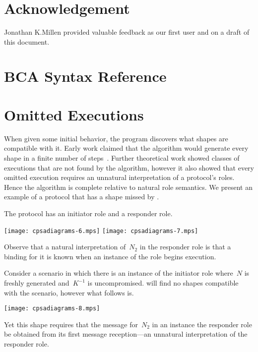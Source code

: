 \documentclass[12pt]{article}
\begin{document}
\section*{Acknowledgement}

Jonathan K.\@ Millen provided valuable feedback as our first {\cpsa}
user and on a draft of this document.

\appendix

\section{BCA Syntax Reference}\label{sec:syntax reference}



\section{Omitted Executions}\label{sec:omitted executions}

When given some initial behavior, the {\cpsa} program discovers what
shapes are compatible with it.  Early work claimed that the {\cpsa}
algorithm would generate every shape in a finite number of
steps~\cite{DoghmiGuttmanThayer07,Guttman11}.  Further theoretical
work showed classes of executions that are not found by the algorithm,
however it also showed that every omitted execution requires an
unnatural interpretation of a protocol's roles.  Hence the algorithm
is complete relative to natural role semantics.  We present an example
of a protocol that has a shape missed by {\cpsa}.

The protocol has an initiator role and a responder role.
\begin{center}
\texttt{[image: cpsadiagrams-6.mps]}\hfil
\texttt{[image: cpsadiagrams-7.mps]}
\end{center}

Observe that a natural interpretation of~$N_2$ in the responder role
is that a binding for it is known when an instance of the role begins
execution.

Consider a scenario in which there is an instance of the initiator
role where~$N$ is freshly generated and~$K^{-1}$ is uncompromised.
{\cpsa} will find no shapes compatible with the scenario, however what
follows is.
\begin{center}
\texttt{[image: cpsadiagrams-8.mps]}
\end{center}
Yet this shape requires that the message for~$N_2$ in an instance the
responder role be obtained from its first message reception---an
unnatural interpretation of the responder role.




\printindex
\end{document}
